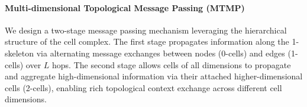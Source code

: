 




\paragraph{Multi-dimensional Topological Message Passing (MTMP)} 
We design a two-stage message passing mechanism leveraging the hierarchical structure of the cell complex. The first stage propagates information along the 1-skeleton via alternating message exchanges between nodes (0-cells) and edges (1-cells) over $L$ hops. The second stage allows cells of all dimensions to propagate and aggregate high-dimensional information via their attached higher-dimensional cells (2-cells), enabling rich topological context exchange across different cell dimensions.

